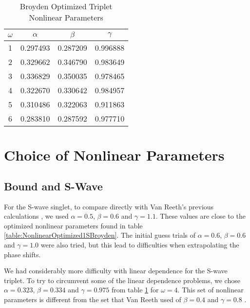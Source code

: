 \documentclass[Dissertation.tex]{subfiles}
\begin{document}
\setlength{\abovecaptionskip}{6pt}   %
\setlength{\belowcaptionskip}{6pt}   %
\begin{table}[ht]
\caption{Broyden Optimized Triplet Nonlinear Parameters}
\centering
\begin{tabular}{c c c c}
\hline\hline
$\omega$ & $\alpha$ & $\beta$ & $\gamma$ \\ [0.5ex]
\hline
1 & 0.297493 & 0.287209 & 0.996888 \\
2 & 0.329662 & 0.346790 & 0.983649 \\
3 & 0.336829 & 0.350035 & 0.978465 \\
4 & 0.322670 & 0.330642 & 0.984957 \\
5 & 0.310486 & 0.322063 & 0.911863 \\
6 & 0.283810 & 0.287592 & 0.977710 \\
\hline\hline
\end{tabular}
\label{table:NonlinearOptimized3SBroyden}
\end{table}

\section{Choice of Nonlinear Parameters}
\subsection{Bound and S-Wave}
For the S-wave singlet, to compare directly with Van Reeth's previous calculations \cite{VanReeth2003}, we used $\alpha = 0.5$, $\beta = 0.6$ and $\gamma = 1.1$.  These values are close to the optimized nonlinear parameters found in table \ref{table:NonlinearOptimized1SBroyden}.  The initial guess trials of $\alpha = 0.6$, $\beta = 0.6$ and $\gamma = 1.0$ were also tried, but this lead to difficulties when extrapolating the phase shifts.

We had considerably more difficulty with linear dependence for the S-wave triplet.  To try to circumvent some of the linear dependence problems, we chose $\alpha = 0.323$, $\beta = 0.334$ and $\gamma = 0.975$ from table \ref{table:NonlinearOptimized3SBroyden} for $\omega = 4$.  This set of nonlinear parameters is different from the set that Van Reeth used of $\beta = 0.4$ and $\gamma = 0.8$ \cite{VanReeth2003}.
\end{document}

